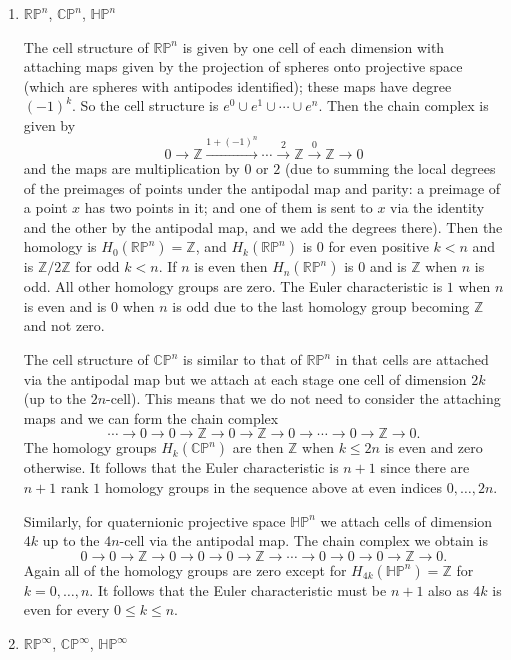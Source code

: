 \documentclass[11pt]{article}
\begin{document}
\begin{enumerate}
\begin{enumerate}
        \item $\mathbb{RP}^n$, $\mathbb{CP}^n$, $\mathbb{HP}^n$
        
        The cell structure of $\mathbb{RP}^n$ is given by one cell of each dimension with attaching maps given by the projection of spheres onto projective space (which are spheres with antipodes identified); these maps have degree $(-1)^k$. So the cell structure is $e^0\cup e^1\cup\cdots \cup e^n$. Then the chain complex is given by \[0\to \mathbb{Z}\xrightarrow{1+(-1)^n}\cdots\xrightarrow{2}\mathbb{Z}\xrightarrow{0}\mathbb{Z}\to 0\] and the maps are multiplication by $0$ or $2$ (due to summing the local degrees of the preimages of points under the antipodal map and parity: a preimage of a point $x$ has two points in it; and one of them is sent to $x$ via the identity and the other by the antipodal map, and we add the degrees there). Then the homology is $H_0(\mathbb{RP}^n) = \mathbb{Z}$, and $H_k(\mathbb{RP}^n)$ is $0$ for even positive $k < n$ and is $\mathbb{Z}/2\mathbb{Z}$ for odd $k < n$. If $n$ is even then $H_n(\mathbb{RP}^n)$ is $0$ and is $\mathbb{Z}$ when $n$ is odd. All other homology groups are zero. The Euler characteristic is $1$ when $n$ is even and is $0$ when $n$ is odd due to the last homology group becoming $\mathbb{Z}$ and not zero.

        The cell structure of $\mathbb{CP}^n$ is similar to that of $\mathbb{RP}^n$ in that cells are attached via the antipodal map but we attach at each stage one cell of dimension $2k$ (up to the $2n$-cell). This means that we do not need to consider the attaching maps and we can form the chain complex \[\cdots \to 0\to 0\to \mathbb{Z}\to 0\to \mathbb{Z}\to 0\to\cdots \to 0\to \mathbb{Z}\to 0.\] The homology groups $H_k(\mathbb{CP}^n)$ are then $\mathbb{Z}$ when $k\leq 2n$ is even and zero otherwise. It follows that the Euler characteristic is $n+1$ since there are $n+1$ rank $1$ homology groups in the sequence above at even indices $0,\dots,2n$.

        Similarly, for quaternionic projective space $\mathbb{HP}^n$ we attach cells of dimension $4k$ up to the $4n$-cell via the antipodal map. The chain complex we obtain is \[0\to 0\to \mathbb{Z}\to 0\to 0\to 0\to \mathbb{Z}\to \cdots\to 0\to 0 \to 0\to \mathbb{Z}\to 0.\] Again all of the homology groups are zero except for $H_{4k}(\mathbb{HP}^n) = \mathbb{Z}$ for $k = 0,\dots,n$. It follows that the Euler characteristic must be $n+1$ also as $4k$ is even for every $0\leq k\leq n$.
        \item $\mathbb{RP}^\infty$, $\mathbb{CP}^\infty$, $\mathbb{HP}^\infty$
        

\end{enumerate}
\end{enumerate}
\end{document}

